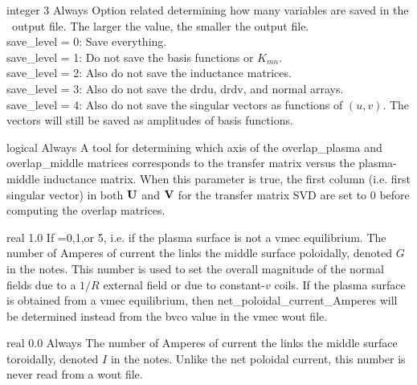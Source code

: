 \myhrule

{integer}
{3}
{Always}
{Option related determining how many variables are saved in the \netCDF~output file.  The larger the value, the smaller the output file.\\

{\ttfamily save\_level} = 0: Save everything.\\

{\ttfamily save\_level} = 1: Do not save the basis functions or $K_{mn}$.\\

{\ttfamily save\_level} = 2: Also do not save the inductance matrices.\\

{\ttfamily save\_level} = 3: Also do not save the {\ttfamily drdu}, {\ttfamily drdv}, and {\ttfamily normal} arrays.\\

{\ttfamily save\_level} = 4: Also do not save the singular vectors as functions of $(u,v)$. The vectors
will still be saved as amplitudes of basis functions.
}

\myhrule

{logical}
{\false}
{Always}
{A tool for determining which axis of the {\ttfamily overlap\_plasma} and {\ttfamily overlap\_middle}
matrices corresponds to the transfer matrix versus the plasma-middle inductance matrix.
When this parameter is true, the first column (i.e. first singular vector) in both ${\mathbf U}$
and ${\mathbf V}$ for the transfer matrix SVD are set to 0 before computing the overlap matrices.
}

\myhrule

{real}
{1.0}
{If =0,1,or 5, i.e. if the plasma surface is not a vmec equilibrium.}
{The number of Amperes of current the links the middle surface poloidally,
denoted $G$ in the notes. This
number is used to set the overall magnitude of the normal fields due to a $1/R$ external
field or due to constant-$v$ coils. If the plasma surface is obtained from a vmec equilibrium,
then {\ttfamily net\_poloidal\_current\_Amperes} will be determined instead
from the {\ttfamily bvco} value in the vmec wout file.
}

\myhrule

{real}
{0.0}
{Always}
{The number of Amperes of current the links the middle surface toroidally,
denoted $I$ in the notes. Unlike the net poloidal current, this number
is never read from a wout file.
}



